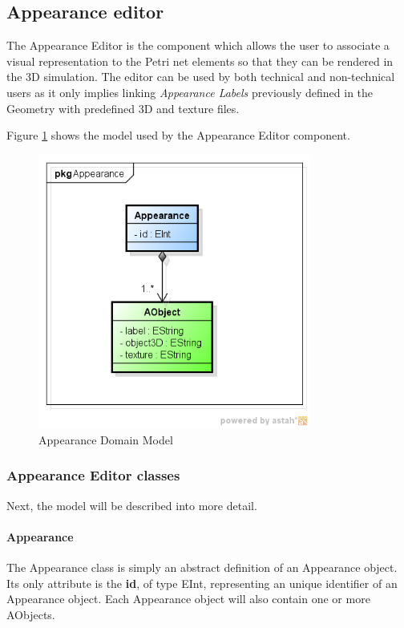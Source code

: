 \subsection{Appearance editor}

The Appearance Editor is the component which allows the user to associate a visual representation to the Petri net elements so that they can be rendered in the 3D simulation. The editor can be used by both technical and non-technical users as it only implies linking \textit{Appearance Labels} previously defined in the Geometry with predefined 3D and texture files. 

Figure \ref{fig:appearance} shows the model used by the Appearance Editor component.

\begin{figure}[htp]
\begin{center}
  \includegraphics[width=0.8\textwidth]{image/appearance-model.png}
  \caption{Appearance Domain Model}
  \label{fig:appearance}
\end{center}
\end{figure}  

\subsubsection{Appearance Editor classes}
Next, the model will be described into more detail.

\paragraph{Appearance}
The Appearance class is simply an abstract definition of an Appearance object. Its only attribute is the \textbf{id}, of type EInt, representing an unique identifier of an Appearance object. Each Appearance object will also contain one or more AObjects.

